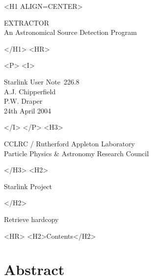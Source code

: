 \documentclass[twoside,11pt]{article}
\newcommand{\stardoccategory}  {Starlink User Note}
\newcommand{\stardocsource}    {sun\stardocnumber}
\newcommand{\stardocnumber}    {226.8}
\newcommand{\stardocauthors}   {A.J. Chipperfield\\
                                P.W. Draper}
\newcommand{\stardocdate}      {24th April 2004}
\newcommand{\stardoctitle}     {EXTRACTOR\\
                                An Astronomical Source Detection Program}
\newcommand{\htmladdnormallink}[2]{#1}
\newcommand{\htmladdimg}[1]{}
\newcommand{\htmlref}[2]{#1}
\newcommand{\htmladdtonavigation}[1]{}
\newcommand{\xlabel}[1]{}
\renewcommand{\_}{\texttt{\symbol{95}}}
\begin{document}
\begin{htmlonly}
   \xlabel{}
   \begin{rawhtml} <H1 ALIGN=CENTER> \end{rawhtml}
      \stardoctitle
   \begin{rawhtml} </H1> <HR> \end{rawhtml}

   \begin{center}
     \htmladdimg{sun226fig.gif}
   \end{center}

   \begin{rawhtml} <P> <I> \end{rawhtml}
   \stardoccategory\ \stardocnumber \\
   \stardocauthors \\
   \stardocdate
   \begin{rawhtml} </I> </P> <H3> \end{rawhtml}
      \htmladdnormallink{CCLRC / Rutherford Appleton Laboratory}
                        {http://www.cclrc.ac.uk}\\
      \htmladdnormallink{Particle Physics \& Astronomy Research Council}
                        {http://www.pparc.ac.uk} \\
   \begin{rawhtml} </H3> <H2> \end{rawhtml}
      \htmladdnormallink{Starlink Project}{http://www.starlink.ac.uk/}
   \begin{rawhtml} </H2> \end{rawhtml}
   \htmladdnormallink{\htmladdimg{source.gif} Retrieve hardcopy}
      {http://www.starlink.ac.uk/cgi-bin/hcserver?\stardocsource}\\

  \label{stardoccontents}
  \begin{rawhtml}
    <HR>
    <H2>Contents</H2>
  \end{rawhtml}
  \htmladdtonavigation{\htmlref{\htmladdimg{contents_motif.gif}}
        {stardoccontents}}

  \section{\xlabel{abstract}Abstract}
\end{htmlonly}
\end{document}
